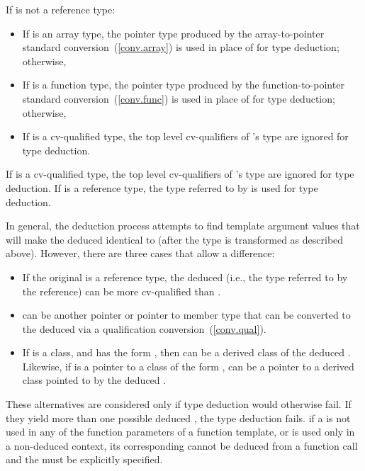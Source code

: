 \pnum
If
is not a reference type:

\begin{itemize}
\item
If
is an array type, the pointer type produced by the array-to-pointer
standard conversion~(\ref{conv.array}) is used in place of
for type deduction;
otherwise,
\item
If
is a function type, the pointer type produced by the
function-to-pointer standard conversion~(\ref{conv.func}) is used in place
of
for type
deduction; otherwise,
\item
If
is a cv-qualified type, the top level cv-qualifiers of
's
type are ignored for type deduction.
\end{itemize}

If
is a cv-qualified type, the top level cv-qualifiers of
's
type are ignored for type deduction.
If
is a reference type, the type
referred to by
is used for type deduction.

\pnum
In general, the deduction process attempts to find template argument
values that will make the deduced
identical to
(after
the type
is transformed as described above).
However, there are
three cases that allow a difference:

\begin{itemize}
\item
If the original
is a reference type, the deduced
(i.e.,
the type referred to by the reference) can be more cv-qualified than
.
\item
{}
can be another pointer or pointer to member type that can be converted
to the deduced
via a qualification conversion~(\ref{conv.qual}).

\item
If
is a class, and
has the form
,
then
can be a derived class of the deduced
.
Likewise, if  is a pointer to a class of the form
,
can be a pointer to a derived class pointed to by the deduced
.
\end{itemize}

These alternatives are considered only if type deduction would
otherwise fail.
If they yield more than one possible deduced
,
the type deduction fails.
\enternote
if a
is not used in any of the function parameters of a function template,
or is used only in a non-deduced context, its corresponding
cannot be deduced from a function call and the
must be explicitly specified.
\exitnote

